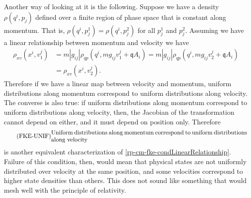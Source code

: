 Another way of looking at it is the following. Suppose we have a density $\rho(q^i, p_j)$ defined over a finite region of phase space that is constant along momentum. That is, $\rho(q^i, p^1_j) = \rho(q^i, p^2_j)$ for all $p^1_j$ and $p^2_j$. Assuming we have a linear relationship between momentum and velocity we have
\begin{equation}
	\begin{aligned}
		\rho_{xv}(x^i, v_1^j) &= m |g_{ij}| \rho_{qp}(q^i, m g_{ij}v_1^j + \mathfrak{q} A_i) = m |g_{ij}| \rho_{qp}(q^i, m g_{ij}v_2^j + \mathfrak{q} A_i) \\
		&= \rho_{xv}(x^i, v_2^j).
	\end{aligned}
\end{equation}
Therefore if we have a linear map between velocity and momentum, uniform distributions along momentum correspond to uniform distributions along velocity. The converse is also true: if uniform distributions along momentum correspond to uniform distributions along velocity, then, the Jacobian of the transformation cannot depend on either, and it must depend on position only. Therefore
\begin{equation}
	\tag{FKE-UNIF}\label{rp-cm-fke-condUniformDistributions}
	\eqtext{Uniform distributions along momentum correspond to uniform distributions along velocity}
\end{equation}
is another equivalent characterization of \ref{rp-cm-fke-condLinearRelationship}. Failure of this condition, then, would mean that physical states are not uniformly distributed over velocity at the same position, and some velocities correspond to higher state densities than others. This does not sound like something that would mesh well with the principle of relativity.

